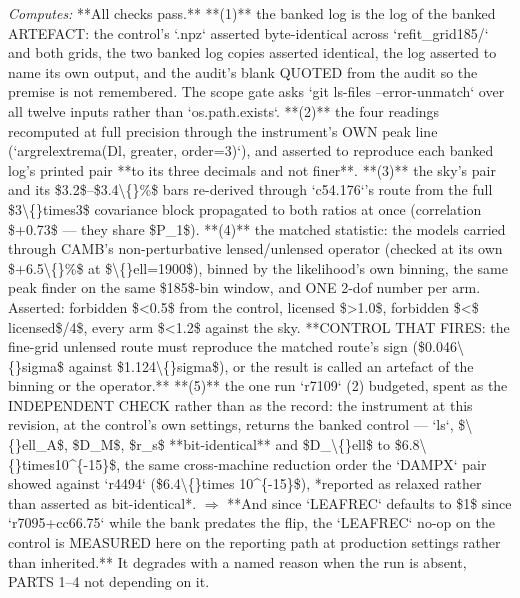 \begin{description}
\emph{Computes:} **All checks pass.** **(1)** the banked log is the log of the banked ARTEFACT: the control's `.npz` asserted byte-identical across `refit\_grid185/` and both grids, the two banked log copies asserted identical, the log asserted to name its own output, and the audit's blank QUOTED from the audit so the premise is not remembered. The scope gate asks `git ls-files --error-unmatch` over all twelve inputs rather than `os.path.exists`. **(2)** the four readings recomputed at full precision through the instrument's OWN peak line (`argrelextrema(Dl, greater, order=3)`), and asserted to reproduce each banked log's printed pair **to its three decimals and not finer**. **(3)** the sky's pair and its \$3.2\$--\$3.4\textbackslash\{\}\%\$ bars re-derived through `c54.176`'s route from the full \$3\textbackslash\{\}times3\$ covariance block propagated to both ratios at once (correlation \$+0.73\$ --- they share \$P\_1\$). **(4)** the matched statistic: the models carried through CAMB's non-perturbative lensed/unlensed operator (checked at its own \$+6.5\textbackslash\{\}\%\$ at \$\textbackslash\{\}ell=1900\$), binned by the likelihood's own binning, the same peak finder on the same \$185\$-bin window, and ONE 2-dof number per arm. Asserted: forbidden \$<0.5\$ from the control, licensed \$>1.0\$, forbidden \$<\$ licensed\$/4\$, every arm \$<1.2\$ against the sky. **CONTROL THAT FIRES: the fine-grid unlensed route must reproduce the matched route's sign (\$0.046\textbackslash\{\}sigma\$ against \$1.124\textbackslash\{\}sigma\$), or the result is called an artefact of the binning or the operator.** **(5)** the one run `r7109` (2) budgeted, spent as the INDEPENDENT CHECK rather than as the record: the instrument at this revision, at the control's own settings, returns the banked control --- `ls`, \$\textbackslash\{\}ell\_A\$, \$D\_M\$, \$r\_s\$ **bit-identical** and \$D\_\textbackslash\{\}ell\$ to \$6.8\textbackslash\{\}times10\textasciicircum{}\{-15\}\$, the same cross-machine reduction order the `DAMPX` pair showed against `r4494` (\$6.4\textbackslash\{\}times 10\textasciicircum{}\{-15\}\$), *reported as relaxed rather than asserted as bit-identical*. \ensuremath{\Rightarrow} **And since `LEAFREC` defaults to \$1\$ since `r7095+cc66.75` while the bank predates the flip, the `LEAFREC` no-op on the control is MEASURED here on the reporting path at production settings rather than inherited.** It degrades with a named reason when the run is absent, PARTS 1--4 not depending on it.

\end{description}
